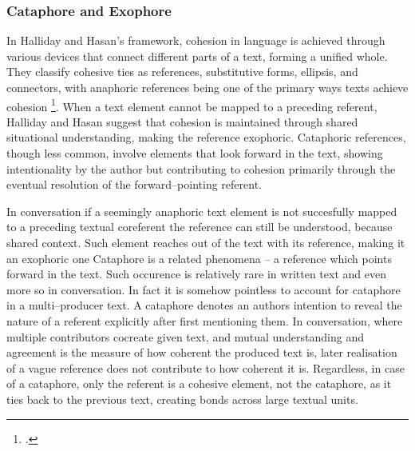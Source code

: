\documentclass[12pt]{report}
\begin{document}
{\subsubsection{Cataphore and Exophore}
\par
    In Halliday and Hasan's framework,
    cohesion in language is achieved through various devices that connect
    different parts of a text, forming a unified whole.
    They classify cohesive ties as
    references, substitutive forms, ellipsis, and connectors, with
    anaphoric references being one of the primary ways texts achieve cohesion \footcite[p.~68]{Halliday76cohesion}.
    When a text element cannot be mapped to a preceding referent,
    Halliday and Hasan suggest that cohesion is maintained through
    shared situational understanding, making the reference exophoric.
    Cataphoric references, though less common, involve
    elements that look forward in the text,
    showing intentionality by the author but contributing to
    cohesion primarily through the eventual resolution of the forward–pointing referent.

\par
    In conversation if a seemingly anaphoric text element is not succesfully mapped
    to a preceding textual coreferent
    the reference can still be understood, because shared context.
    Such element reaches out of the text with its reference, making it an exophoric one
    Cataphore is a related phenomena –
    a reference which points forward in the text.
    Such occurence is relatively rare in written text and even more so in conversation.
    In fact it is somehow pointless to account for cataphore in a multi–producer text.
    A cataphore denotes an authors intention to reveal
    the nature of a referent explicitly after first mentioning them.
    In conversation, where multiple contributors cocreate given text,
    and mutual understanding and agreement is the measure of
    how coherent the produced text is, later realisation of a vague reference
    does not contribute to how coherent it is.
    Regardless, in case of a cataphore,
    only the referent is a cohesive element,
    not the cataphore,
    as it ties back to the previous text, creating bonds across large textual units.

}
\end{document}
